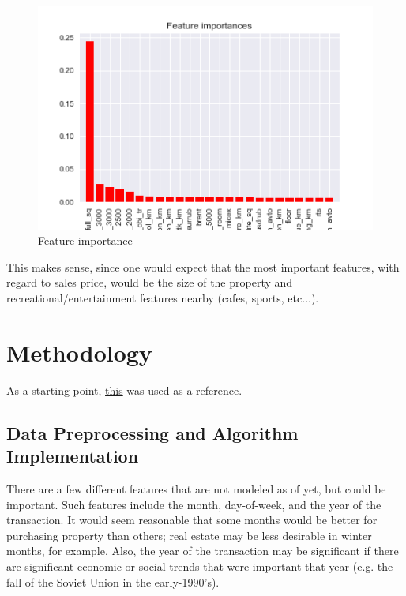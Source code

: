 \documentclass[12pt]{article}
\theoremstyle{plain} %
\theoremstyle{definition} %
\theoremstyle{remark} %
\begin{document}
\begin{figure}[h!]
\begin{center}
\includegraphics[width=15cm]{./output_images/importance.png}
\caption{Feature importance}
\label{fig:thirteen}
\end{center}
\end{figure}

This makes sense, since one would expect that the most important features, with regard to sales price, would be the size of the property and recreational/entertainment features nearby (cafes, sports, etc...).

\section{Methodology}

As a starting point, \href{https://www.kaggle.com/bguberfain/naive-xgb-lb-0-317}{this} was used as a reference.

\subsection*{Data Preprocessing and Algorithm Implementation}
\indent \par There are a few different features that are not modeled as of yet, but could be important.  Such features include the month, day-of-week, and the year of the transaction.  It would seem reasonable that some months would be better for purchasing property than others; real estate may be less desirable in winter months, for example.  Also, the year of the transaction may be significant if there are significant economic or social trends that were important that year (e.g. the fall of the Soviet Union in the early-1990's).
\end{document}

